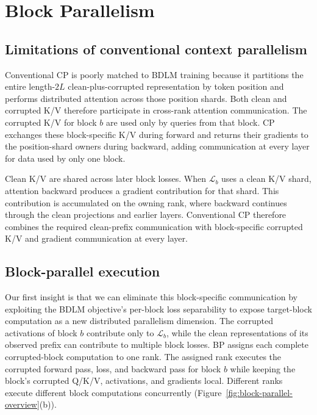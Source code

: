 \section{Block Parallelism}
\label{sec:method}

\subsection{Limitations of conventional context parallelism}
\label{sec:cp-limitations}

Conventional CP is poorly matched to BDLM training because it partitions the
entire length-$2L$ clean-plus-corrupted representation by token position and
performs distributed attention across those position shards. Both clean and
corrupted K/V therefore participate in cross-rank attention communication.
The corrupted K/V for block $b$ are used only by queries from that block. CP
exchanges these block-specific K/V during forward and returns their gradients
to the position-shard owners during backward, adding communication at every
layer for data used by only one block.

Clean K/V are shared across later block losses. When
$\mathcal{L}_b$ uses a clean K/V shard, attention backward produces a gradient
contribution for that shard. This contribution is accumulated on the owning
rank, where backward continues through the clean projections and earlier
layers. Conventional CP therefore combines the required clean-prefix
communication with block-specific corrupted K/V and gradient communication at
every layer.

\subsection{Block-parallel execution}
\label{sec:block-parallel-training}

Our first insight is that we can eliminate this block-specific communication by
exploiting the BDLM objective's per-block loss separability to expose
target-block computation as a new distributed parallelism dimension. The
corrupted activations of block $b$ contribute only to $\mathcal{L}_b$, while
the clean representations of its observed prefix can contribute to multiple
block losses. BP assigns each complete corrupted-block computation to one rank.
The assigned rank executes the corrupted forward pass, loss, and backward pass
for block $b$ while keeping the block's corrupted Q/K/V, activations, and
gradients local. Different ranks execute different block computations
concurrently (Figure~\ref{fig:block-parallel-overview}(b)).

